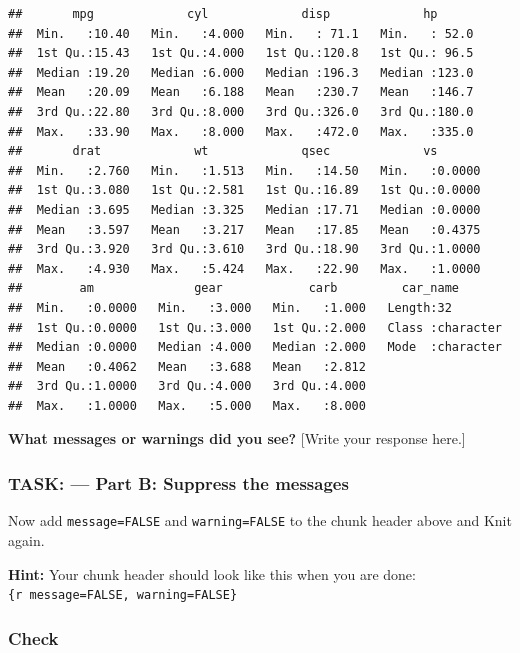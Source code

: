 \documentclass[
]{article}
\begin{document}
\begin{verbatim}
##       mpg             cyl             disp             hp       
##  Min.   :10.40   Min.   :4.000   Min.   : 71.1   Min.   : 52.0  
##  1st Qu.:15.43   1st Qu.:4.000   1st Qu.:120.8   1st Qu.: 96.5  
##  Median :19.20   Median :6.000   Median :196.3   Median :123.0  
##  Mean   :20.09   Mean   :6.188   Mean   :230.7   Mean   :146.7  
##  3rd Qu.:22.80   3rd Qu.:8.000   3rd Qu.:326.0   3rd Qu.:180.0  
##  Max.   :33.90   Max.   :8.000   Max.   :472.0   Max.   :335.0  
##       drat             wt             qsec             vs        
##  Min.   :2.760   Min.   :1.513   Min.   :14.50   Min.   :0.0000  
##  1st Qu.:3.080   1st Qu.:2.581   1st Qu.:16.89   1st Qu.:0.0000  
##  Median :3.695   Median :3.325   Median :17.71   Median :0.0000  
##  Mean   :3.597   Mean   :3.217   Mean   :17.85   Mean   :0.4375  
##  3rd Qu.:3.920   3rd Qu.:3.610   3rd Qu.:18.90   3rd Qu.:1.0000  
##  Max.   :4.930   Max.   :5.424   Max.   :22.90   Max.   :1.0000  
##        am              gear            carb         car_name        
##  Min.   :0.0000   Min.   :3.000   Min.   :1.000   Length:32         
##  1st Qu.:0.0000   1st Qu.:3.000   1st Qu.:2.000   Class :character  
##  Median :0.0000   Median :4.000   Median :2.000   Mode  :character  
##  Mean   :0.4062   Mean   :3.688   Mean   :2.812                     
##  3rd Qu.:1.0000   3rd Qu.:4.000   3rd Qu.:4.000                     
##  Max.   :1.0000   Max.   :5.000   Max.   :8.000
\end{verbatim}

\textbf{What messages or warnings did you see?} {[}Write your response
here.{]}

\subsubsection{TASK: --- Part B: Suppress the
messages}\label{task-part-b-suppress-the-messages}

Now add \texttt{message=FALSE} and \texttt{warning=FALSE} to the chunk
header above and Knit again.

\textbf{Hint:} Your chunk header should look like this when you are
done:
\texttt{\textasciigrave{}\textasciigrave{}\textasciigrave{}\{r\ message=FALSE,\ warning=FALSE\}}

\subsubsection{Check}\label{check-2}
\end{document}
